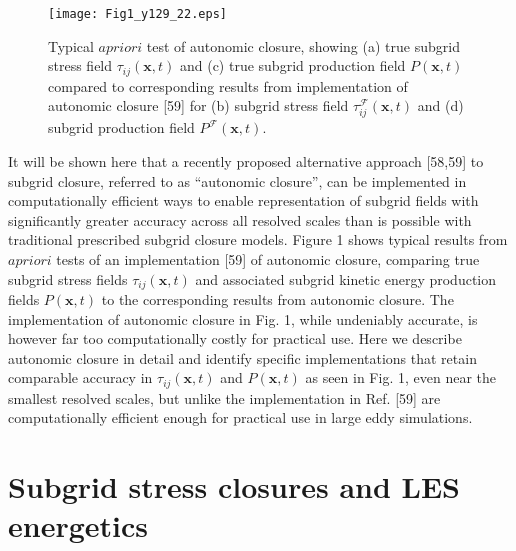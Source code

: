 %
\begin{figure}
	\begin{center}
	\texttt{[image: Fig1\_y129\_22.eps]}
	\caption{Typical   $a priori$   test of autonomic closure, showing (a) true subgrid stress field $\tau_{ij}(\mathbf{x},t)$   and (c) true subgrid production field  $P(\mathbf{x},t)$ compared to corresponding results from implementation of autonomic closure [59] for (b) subgrid stress field  $\tau_{ij}^{\mathcal{F}}(\mathbf{x},t)$  and (d) subgrid production field  $P^{\mathcal{F}}(\mathbf{x},t)$.}
	\label{default}
	\end{center}
\end{figure}
%
%

It will be shown here that a recently proposed alternative approach [58,59] to subgrid closure, referred to as “autonomic closure”, can be implemented in computationally efficient ways to enable representation of subgrid fields with significantly greater accuracy across all resolved scales than is possible with traditional prescribed subgrid closure models. Figure 1 shows typical results from  $a priori$  tests of an implementation [59] of autonomic closure, comparing true subgrid stress fields  $\tau_{ij}(\mathbf{x},t)$  and associated subgrid kinetic energy production fields  $P(\mathbf{x},t)$  to the corresponding results from autonomic closure. The implementation of autonomic closure in Fig. 1, while undeniably accurate, is however far too computationally costly for practical use. Here we describe autonomic closure in detail and identify specific implementations that retain comparable accuracy in  $\tau_{ij}(\mathbf{x},t)$  and  $P(\mathbf{x},t)$  as seen in Fig. 1, even near the smallest resolved scales, but unlike the implementation in Ref. [59] are computationally efficient enough for practical use in large eddy simulations. 

\section{Subgrid stress closures and LES energetics} 

